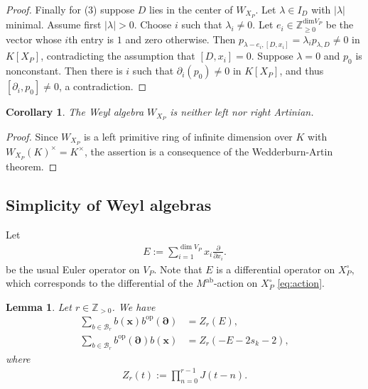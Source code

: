 \documentclass[11pt,a4paper,usenames,dvipsnames,reqno]{amsart}
\numberwithin{equation}{section}
\newcommand{\zz}{\mathbb Z}
\newtheorem{Lem}[Thm]{Lemma}
\newtheorem{Cor}[Thm]{Corollary}
\theoremstyle{definition}
\theoremstyle{remark}
\begin{document}
\begin{proof}
Finally for (3) suppose $D$ lies in the center of $W_{X_P}$. Let $\lambda\in I_D$ with $|\lambda|$ minimal. Assume first $|\lambda|>0$. Choose $i$ such that $\lambda_i\neq 0$. Let $e_i\in \zz_{\ge 0}^{\mathrm{dim}V_P}$ be the vector whose $i$th entry is $1$ and zero otherwise. Then $p_{\lambda-e_i,[D,x_i]}=\lambda_i p_{\lambda,D}\neq 0$
in $K[X_P]$, contradicting the assumption that $[D,x_i]=0$. Suppose $\lambda=0$ and $p_0$ is nonconstant. Then there is $i$ such that $\partial_i(p_0)\neq 0$ in $K[X_P]$, and thus $[\partial_i,p_0]\neq 0$, a contradiction.
\end{proof}



\begin{Cor}
The Weyl algebra $W_{X_P}$ is neither left nor right Artinian.
\end{Cor}
\begin{proof}
Since $W_{X_P}$ is a left primitive ring of infinite dimension over $K$ with $W_{X_P}(K)^\times=K^\times$, the assertion is a consequence of the Wedderburn-Artin theorem. 
\end{proof}


\subsection{Simplicity of Weyl algebras}

Let 
\begin{align*}
    E:=\sum_{i=1}^{\dim V_P} x_i\frac{\partial}{\partial x_i}.
\end{align*}
be the usual Euler operator on $V_P$. Note that $E$ is a differential operator on $X_P^\circ,$ which corresponds to the differential of the $M^{\mathrm{ab}}$-action on $X_P^\circ$ \eqref{eq:action}.
\begin{Lem}\label{Lem:unitgen}
Let $r\in \zz_{>0}$. We have
\begin{align*}
    \sum_{b\in \mathcal{B}_r} b(\mathbf{x})b^{\mathrm{op}}(\mathbf{\partial})&=Z_r(E),\\
     \sum_{b\in \mathcal{B}_r} b^{\mathrm{op}}(\mathbf{\partial}) b(\mathbf{x})&=Z_r(-E-2s_k-2),
\end{align*}
where
\begin{align*}
    Z_r(t):=\prod_{n=0}^{r-1}J(t-n).
\end{align*}
\end{Lem}
\end{document}
